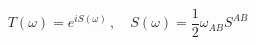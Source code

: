 \begin{equation}\label{TeS}
T(\omega)=e^{iS(\omega)}\,,\quad S(\omega)=\frac{1}{2}
\omega_{AB} S^{AB}
\end{equation}

